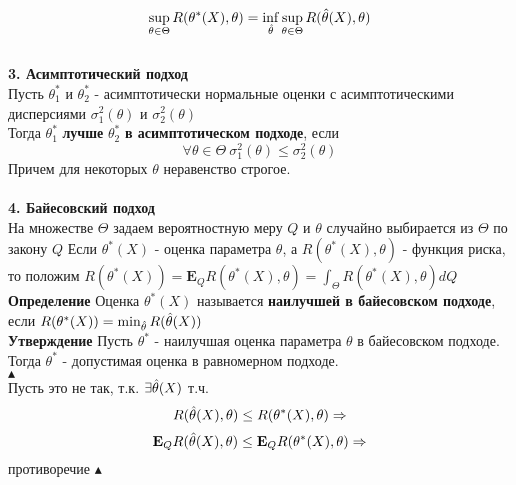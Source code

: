 \documentclass[25pt]{article}
\begin{document}
$$\sup_{\theta\in\Theta}R(\theta^*(X),\theta)=\inf_{\Hat{\theta}}\sup_{\theta\in\Theta}R(\Hat{\theta}(X),\theta) $$
\\
\textbf{3. Асимптотический подход}\\
Пусть $\theta^*_1$ и $\theta^*_2$ - асимптотически нормальные оценки с асимптотическими дисперсиями $\sigma_1^2(\theta)$ и $\sigma_2^2(\theta)$\\
Тогда $\theta^*_1$ \textbf{лучше} $\theta^*_2$ \textbf{в асимптотическом подходе}, если
$$\forall \theta\in\Theta\ \sigma_1^2(\theta)\leq\sigma^2_2(\theta)$$
Причем для некоторых $\theta$ неравенство строгое.\\ \\
\textbf{4. Байесовский подход}\\
На множестве $\Theta$ задаем вероятностную меру $Q$ и $\theta$ случайно выбирается из $\Theta$ по закону $Q$
Если $\theta^*(X)$ - оценка параметра $\theta$, а $R(\theta^*(X),\theta)$ - функция риска, то положим $R(\theta^*(X)) = \textbf{E}_Q R(\theta^*(X),\theta) = \int_\Theta R(\theta^*(X),\theta)d Q$\\
\textbf{Определение} Оценка $\theta^*(X)$ называется \textbf{наилучшей в байесовском подходе}, если $R(\theta^*(X)) = \min_{\Hat{\theta}}R(\Hat{\theta}(X))$\\
\textbf{Утверждение} Пусть $\theta^*$ - наилучшая оценка параметра $\theta$ в байесовском подходе.
Тогда $\theta^*$ - допустимая оценка в равномерном подходе.\\
$\blacktriangle$
\\
Пусть это не так, т.к. $\exists \Hat{\theta}(X)$ т.ч.
$$R(\Hat{\theta}(X),\theta) \leq R(\theta^*(X),\theta) \Rightarrow$$
$$\textbf{E}_Q R(\Hat{\theta}(X),\theta) \leq \textbf{E}_Q R(\theta^*(X),\theta) \Rightarrow$$
противоречие
$\blacktriangle$
\end{document}
